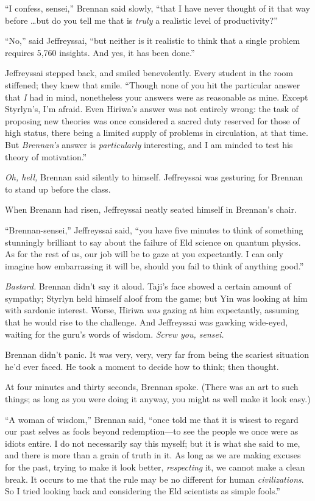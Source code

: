 {
 ``I confess, sensei,'' Brennan
said slowly, ``that I have never thought of it that
way before \ldots but do you tell me that is \textit{truly} a realistic
level of productivity?''}

{
 ``No,'' said Jeffreyssai,
``but neither is it realistic to think that a single
problem requires 5,760 insights. And yes, it has been
done.''}

{
 Jeffreyssai stepped back, and smiled benevolently. Every student
in the room stiffened; they knew that smile. ``Though
none of you hit the particular answer that \textit{I} had in mind,
nonetheless your answers were as reasonable as mine. Except
Styrlyn's, I'm afraid. Even
Hiriwa's answer was not entirely wrong: the task of
proposing new theories was once considered a sacred duty reserved for
those of high status, there being a limited supply of problems in
circulation, at that time. But \textit{Brennan's}
answer is \textit{particularly} interesting, and I am minded to test
his theory of motivation.''}

{
 \textit{Oh, hell,} Brennan said silently to himself. Jeffreyssai
was gesturing for Brennan to stand up before the class.}

{
 When Brenann had risen, Jeffreyssai neatly seated himself in
Brennan's chair.}

{
 ``Brennan-sensei,'' Jeffreyssai
said, ``you have five minutes to think of something
stunningly brilliant to say about the failure of Eld science on quantum
physics. As for the rest of us, our job will be to gaze at you
expectantly. I can only imagine how embarrassing it will be, should you
fail to think of anything good.''}

{
 \textit{Bastard.} Brennan didn't say it aloud.
Taji's face showed a certain amount of sympathy;
Styrlyn held himself aloof from the game; but Yin was looking at him
with sardonic interest. Worse, Hiriwa \textit{was} gazing at him
expectantly, assuming that he would rise to the challenge. And
Jeffreyssai was gawking wide-eyed, waiting for the
guru's words of wisdom. \textit{Screw you, sensei.}}

{
 Brennan didn't panic. It was very, very, very far
from being the scariest situation he'd ever faced. He
took a moment to decide how to think; then thought.}

{
 At four minutes and thirty seconds, Brennan spoke. (There was an
art to such things; as long as you were doing it anyway, you might as
well make it look easy.)}

{
 ``A woman of wisdom,'' Brennan
said, ``once told me that it is wisest to regard our
past selves as fools beyond redemption---to see the people we once were
as idiots entire. I do not necessarily say this myself; but it is what
she said to me, and there is more than a grain of truth in it. As long
as we are making excuses for the past, trying to make it look better,
\textit{respecting} it, we cannot make a clean break. It occurs to me
that the rule may be no different for human \textit{civilizations}. So
I tried looking back and considering the Eld scientists as simple
fools.''}

